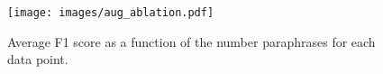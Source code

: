 \begin{figure}[t]
\medskip
\centering
\texttt{[image: images/aug\_ablation.pdf]}
\vspace{-0.5em}
\caption{Average F1 score as a function of the number paraphrases for each data point.}
\label{fig:aug_ablation}
\vspace{-0.15in}
\end{figure}